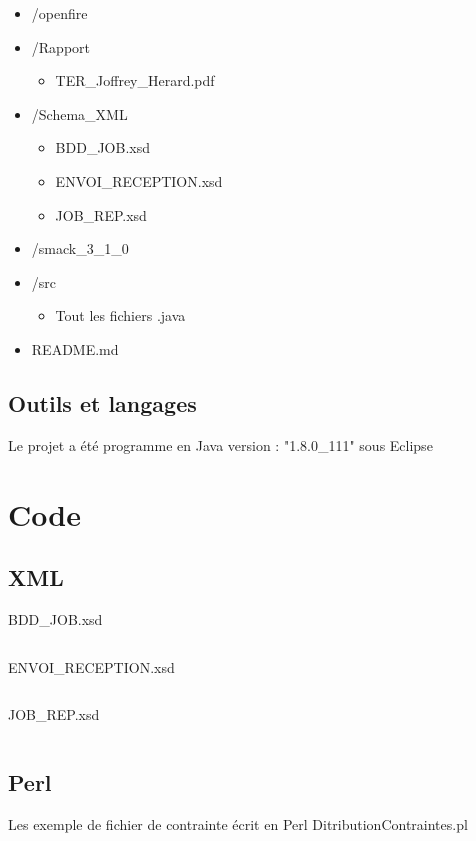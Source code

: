 \documentclass[11pt]{report}
\begin{document}
\begin{itemize}
\begin{itemize}
		\item /openfire
		\item /Rapport \begin{itemize}\item TER\_Joffrey\_Herard.pdf  \end{itemize} 
		\item /Schema\_XML \begin{itemize}\item BDD\_JOB.xsd \item ENVOI\_RECEPTION.xsd \item JOB\_REP.xsd \end{itemize}
		\item /smack\_3\_1\_0
		\item /src \begin{itemize}\item Tout les fichiers .java \end{itemize}
		\item README.md 
\end{itemize}

\end{itemize}
\subsection{Outils et langages} 
Le projet a été programme en Java version : "1.8.0\_111" sous Eclipse  

\newpage
\section{Code}
\newpage
\subsection{XML} 

BDD\_JOB.xsd
\inputminted[tabsize=2,frame=lines,linenos]{XML}{../Schema_XML/BDD_JOB.xsd}

ENVOI\_RECEPTION.xsd
\inputminted[tabsize=2,frame=lines,linenos]{XML}{../Schema_XML/ENVOI_RECEPTION.xsd}
\newpage
JOB\_REP.xsd
\inputminted[tabsize=2,frame=lines,linenos]{XML}{../Schema_XML/JOB_REP.xsd}
\newpage
\subsection{Perl}
Les exemple de fichier de contrainte écrit en Perl 
DitributionContraintes.pl
\inputminted[tabsize=2,frame=lines,linenos]{Perl}{../Echantillon_Script_Perl/DitributionContraintes.pl}
\newpage
\end{document}
